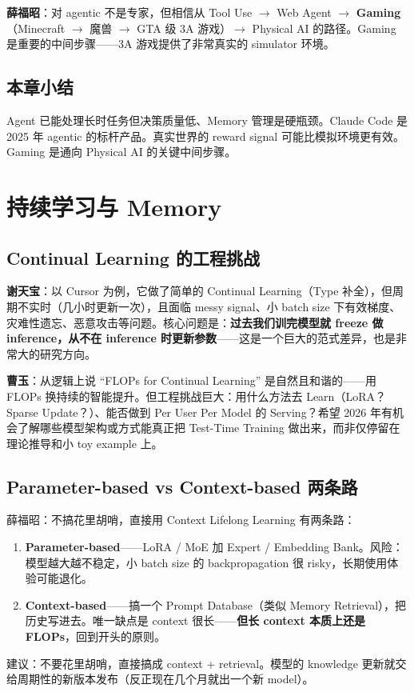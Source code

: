 \documentclass[a4paper]{article}
\begin{document}
\textbf{薛福昭}：对 agentic 不是专家，但相信从 Tool Use $\to$ Web Agent $\to$ \textbf{Gaming}（Minecraft $\to$ 魔兽 $\to$ GTA 级 3A 游戏）$\to$ Physical AI 的路径。Gaming 是重要的中间步骤——3A 游戏提供了非常真实的 simulator 环境。

\subsection{本章小结}
Agent 已能处理长时任务但决策质量低、Memory 管理是硬瓶颈。Claude Code 是 2025 年 agentic 的标杆产品。真实世界的 reward signal 可能比模拟环境更有效。Gaming 是通向 Physical AI 的关键中间步骤。

\section{持续学习与 Memory}

\subsection{Continual Learning 的工程挑战}

\textbf{谢天宝}：以 Cursor 为例，它做了简单的 Continual Learning（Type 补全），但周期不实时（几小时更新一次），且面临 messy signal、小 batch size 下有效梯度、灾难性遗忘、恶意攻击等问题。核心问题是：\textbf{过去我们训完模型就 freeze 做 inference，从不在 inference 时更新参数}——这是一个巨大的范式差异，也是非常大的研究方向。

\textbf{曹玉}：从逻辑上说 ``FLOPs for Continual Learning'' 是自然且和谐的——用 FLOPs 换持续的智能提升。但工程挑战巨大：用什么方法去 Learn（LoRA？Sparse Update？）、能否做到 Per User Per Model 的 Serving？希望 2026 年有机会了解哪些模型架构或方式能真正把 Test-Time Training 做出来，而非仅停留在理论推导和小 toy example 上。

\subsection{Parameter-based vs Context-based 两条路}

\begin{knowledgebox}{薛福昭：不搞花里胡哨，直接用 Context}
Lifelong Learning 有两条路：
\begin{enumerate}
  \item \textbf{Parameter-based}——LoRA / MoE 加 Expert / Embedding Bank。风险：模型越大越不稳定，小 batch size 的 backpropagation 很 risky，长期使用体验可能退化。
  \item \textbf{Context-based}——搞一个 Prompt Database（类似 Memory Retrieval），把历史写进去。唯一缺点是 context 很长——\textbf{但长 context 本质上还是 FLOPs}，回到开头的原则。
\end{enumerate}
建议：不要花里胡哨，直接搞成 context + retrieval。模型的 knowledge 更新就交给周期性的新版本发布（反正现在几个月就出一个新 model）。
\end{knowledgebox}
\end{document}
